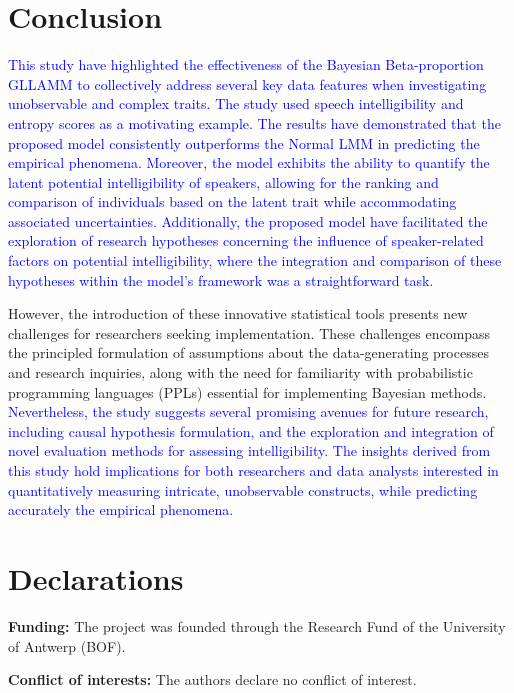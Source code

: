 \documentclass[
  authoryear,
  preprint,
  1p]{elsarticle}
\begin{document}
\section{Conclusion}\label{sec-conclusion}

\textcolor{blue}{This study have highlighted the effectiveness of the Bayesian
Beta-proportion GLLAMM to collectively address several key data features
when investigating unobservable and complex traits. The study used
speech intelligibility and entropy scores as a motivating example. The
results have demonstrated that the proposed model consistently
outperforms the Normal LMM in predicting the empirical phenomena.
Moreover, the model exhibits the ability to quantify the latent
potential intelligibility of speakers, allowing for the ranking and
comparison of individuals based on the latent trait while accommodating
associated uncertainties. Additionally, the proposed model have
facilitated the exploration of research hypotheses concerning the
influence of speaker-related factors on potential intelligibility, where
the integration and comparison of these hypotheses within the model's
framework was a straightforward task.}

However, the introduction of these innovative statistical tools presents
new challenges for researchers seeking implementation. These challenges
encompass the principled formulation of assumptions about the
data-generating processes and research inquiries, along with the need
for familiarity with probabilistic programming languages (PPLs)
essential for implementing Bayesian methods. \textcolor{blue}{Nevertheless, the study
suggests several promising avenues for future research, including causal
hypothesis formulation, and the exploration and integration of novel
evaluation methods for assessing intelligibility. The insights derived
from this study hold implications for both researchers and data analysts
interested in quantitatively measuring intricate, unobservable
constructs, while predicting accurately the empirical phenomena.}

\newpage{}

\section*{Declarations}\label{declarations}

\textbf{Funding:} The project was founded through the Research Fund of
the University of Antwerp (BOF).

\textbf{Conflict of interests:} The authors declare no conflict of
interest.
\end{document}
